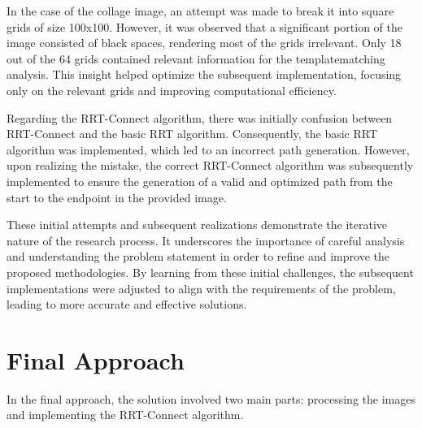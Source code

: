 \documentclass[letterpaper, 10 pt, conference]{IEEEtran}
\begin{document}
In the case of the collage image, an attempt was made to break it into square grids of 
size 100x100. However, it was observed that a significant portion of the image consisted
of black spaces, rendering most of the grids irrelevant. Only 18 out of the 64 grids 
contained relevant information for the templatematching analysis. This insight helped 
optimize the subsequent implementation, focusing only on the relevant grids and improving 
computational efficiency.

Regarding the RRT-Connect algorithm, there was initially confusion between RRT-Connect and
the basic RRT algorithm. Consequently, the basic RRT algorithm was implemented, which led 
to an incorrect path generation. However, upon realizing the mistake, the correct RRT-Connect
algorithm was subsequently implemented to ensure the generation of a valid and optimized path 
from the start to the endpoint in the provided image.

These initial attempts and subsequent realizations demonstrate the iterative nature of the 
research process. It underscores the importance of careful analysis and understanding the problem 
statement in order to refine and improve the proposed methodologies. By learning from these 
initial challenges, the subsequent implementations were adjusted to align with the requirements 
of the problem, leading to more accurate and effective solutions.

\section{Final Approach}


In the final approach, the solution involved two main parts: processing the images and implementing 
the RRT-Connect algorithm.
\end{document}
